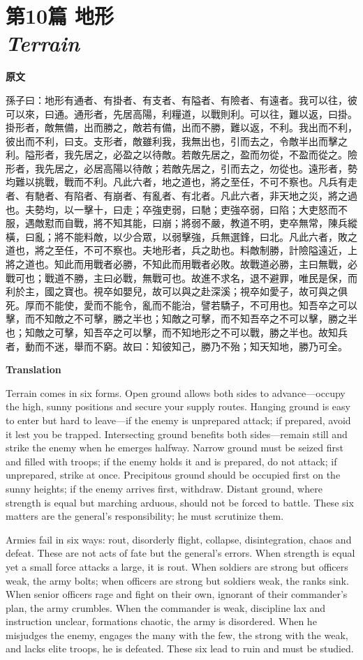 \documentclass[12pt]{book}
\newcommand{\chapterentry}[4]{%
  \chapter[\texorpdfstring{#1}{#1}]{\texorpdfstring{#1\\\Large\textit{#2}}{#1 — #2}}%
  \noindent\textbf{原文}\par
  #3

  \bigskip
  \noindent\textbf{Translation}\par
  #4
}
\begin{document}
\chapterentry{第10篇 地形}{Terrain}{%
孫子曰：地形有通者、有掛者、有支者、有隘者、有險者、有遠者。我可以往，彼可以來，曰通。通形者，先居高陽，利糧道，以戰則利。可以往，難以返，曰掛。掛形者，敵無備，出而勝之，敵若有備，出而不勝，難以返，不利。我出而不利，彼出而不利，曰支。支形者，敵雖利我，我無出也，引而去之，令敵半出而擊之利。隘形者，我先居之，必盈之以待敵。若敵先居之，盈而勿從，不盈而從之。險形者，我先居之，必居高陽以待敵；若敵先居之，引而去之，勿從也。遠形者，勢均難以挑戰，戰而不利。凡此六者，地之道也，將之至任，不可不察也。凡兵有走者、有馳者、有陷者、有崩者、有亂者、有北者。凡此六者，非天地之災，將之過也。夫勢均，以一擊十，曰走；卒強吏弱，曰馳；吏強卒弱，曰陷；大吏怒而不服，遇敵懟而自戰，將不知其能，曰崩；將弱不嚴，教道不明，吏卒無常，陳兵縱橫，曰亂；將不能料敵，以少合眾，以弱擊強，兵無選鋒，曰北。凡此六者，敗之道也，將之至任，不可不察也。夫地形者，兵之助也。料敵制勝，計險隘遠近，上將之道也。知此而用戰者必勝，不知此而用戰者必敗。故戰道必勝，主曰無戰，必戰可也；戰道不勝，主曰必戰，無戰可也。故進不求名，退不避罪，唯民是保，而利於主，國之寶也。視卒如嬰兒，故可以與之赴深溪；視卒如愛子，故可與之俱死。厚而不能使，愛而不能令，亂而不能治，譬若驕子，不可用也。知吾卒之可以擊，而不知敵之不可擊，勝之半也；知敵之可擊，而不知吾卒之不可以擊，勝之半也；知敵之可擊，知吾卒之可以擊，而不知地形之不可以戰，勝之半也。故知兵者，動而不迷，舉而不窮。故曰：知彼知己，勝乃不殆；知天知地，勝乃可全。}{%
Terrain comes in six forms. Open ground allows both sides to advance—occupy the high, sunny positions and secure your supply routes. Hanging ground is easy to enter but hard to leave—if the enemy is unprepared attack; if prepared, avoid it lest you be trapped. Intersecting ground benefits both sides—remain still and strike the enemy when he emerges halfway. Narrow ground must be seized first and filled with troops; if the enemy holds it and is prepared, do not attack; if unprepared, strike at once. Precipitous ground should be occupied first on the sunny heights; if the enemy arrives first, withdraw. Distant ground, where strength is equal but marching arduous, should not be forced to battle. These six matters are the general’s responsibility; he must scrutinize them.

Armies fail in six ways: rout, disorderly flight, collapse, disintegration, chaos and defeat. These are not acts of fate but the general’s errors. When strength is equal yet a small force attacks a large, it is rout. When soldiers are strong but officers weak, the army bolts; when officers are strong but soldiers weak, the ranks sink. When senior officers rage and fight on their own, ignorant of their commander’s plan, the army crumbles. When the commander is weak, discipline lax and instruction unclear, formations chaotic, the army is disordered. When he misjudges the enemy, engages the many with the few, the strong with the weak, and lacks elite troops, he is defeated. These six lead to ruin and must be studied.

}
\end{document}
